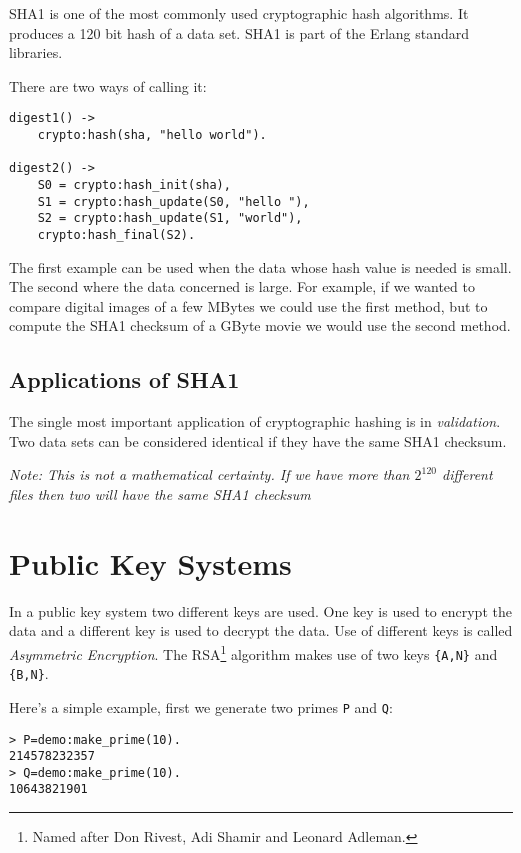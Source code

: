 \documentclass[12pt]{article}
\begin{document}
SHA1 is one of the most commonly used cryptographic hash algorithms.
It produces a 120 bit hash of a data set.
SHA1 is part of the Erlang standard libraries.

There are two ways of calling it:

\begin{Verbatim}[frame=single]
digest1() ->
    crypto:hash(sha, "hello world").

digest2() ->
    S0 = crypto:hash_init(sha),
    S1 = crypto:hash_update(S0, "hello "),
    S2 = crypto:hash_update(S1, "world"),
    crypto:hash_final(S2).
\end{Verbatim}

The first example can be used when the data whose hash value is needed
is small.  The second where the data concerned is large. For example, if
we wanted to compare digital images of a few MBytes we could use
the first method, but to compute the SHA1 checksum of a GByte movie we
would use the second method.

\subsection{Applications of SHA1}

The single most important application of cryptographic hashing is in {\sl
  validation}. Two data sets can be considered identical if they have
the same SHA1 checksum.

{\sl Note: This is not a mathematical certainty. If we have more than $2^{120}$
  different files then two will have the same SHA1 checksum}

\section{Public Key Systems}

In a public key system two different keys are used. One key is used to
encrypt the data and a different key is used to decrypt the data.
Use of different keys is called {\sl Asymmetric Encryption}.
The RSA\footnote{Named after Don Rivest, Adi Shamir and Leonard Adleman.}  
algorithm makes use of two keys \verb+{A,N}+ and
\verb+{B,N}+.

Here's a simple example, first we generate two primes \verb+P+ and \verb+Q+:

\begin{verbatim}
> P=demo:make_prime(10).
214578232357
> Q=demo:make_prime(10).
10643821901
\end{verbatim}
\end{document}
